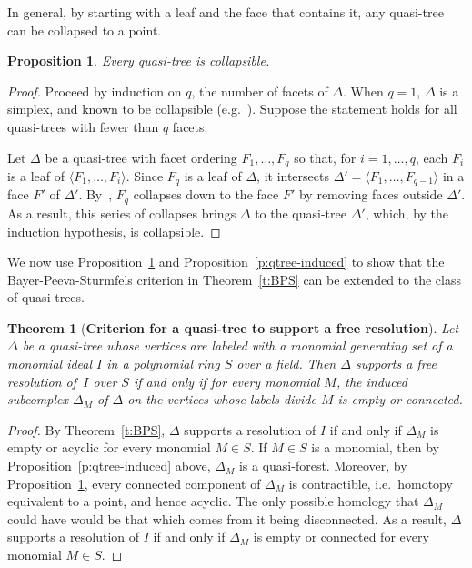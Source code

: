 \documentclass[11pt]{article}
\newtheorem{theorem}[theo]{Theorem}
\newtheorem{prop}[theo]{Proposition}
\theoremstyle{definition}
\providecommand{\eg}{e.g.\ }
\providecommand{\ie}{i.e.\ }
\numberwithin{equation}{section}
\newcommand{\D}{\Delta}
\newcommand{\tuple}[1]{\langle #1 \rangle}
\begin{document}
In general, by starting with a leaf and the face that contains it, any
quasi-tree can be collapsed to a point.


\begin{prop}\label{p:qtree-collapsible}
Every quasi-tree is collapsible. 
\end{prop}


\begin{proof} 
Proceed by induction on $q$, the number of facets of $\D$. When $q=1$,
$\D$ is a simplex, and known to be collapsible (\eg \cite[Proposition~2.7]{F14}). Suppose the statement holds for all quasi-trees with
fewer than $q$ facets.

Let $\D$ be a quasi-tree with facet ordering $F_1,\ldots,F_q$ so
that,  for $i=1,\ldots,q$, each $F_i$ is a leaf of $\tuple{F_1,\ldots,F_i}$.  Since $F_q$ is a leaf of $\D$, it intersects
$\D'=\tuple{F_1,\ldots,F_{q-1}}$ in a face $F'$ of $\D'$. By~\cite[Proposition~2.7]{F14}, $F_q$ collapses down to the face
$F'$ by removing faces outside $\D'$. As a result, this series of
collapses brings $\D$ to the quasi-tree $\D'$, which, by the induction
hypothesis, is collapsible. 
\end{proof}



We now use Proposition~\ref{p:qtree-collapsible} and Proposition~\ref{p:qtree-induced} to
show that the Bayer-Peeva-Sturmfels criterion in Theorem~\ref{t:BPS} can be extended to the class
of quasi-trees.

\begin{theorem}[{\bf Criterion for a quasi-tree to support a free  resolution}]\label{t:res-by-quasitree} Let~$\D$ be a quasi-tree whose vertices are labeled
with a monomial generating set of a monomial ideal $I$ in a
polynomial ring $S$ over a field.  Then $\D$ supports a free
resolution of~$I$ over $S$ if and only if for every monomial $M$, the
induced subcomplex $\D_M$ of $\D$ on the vertices whose labels divide
$M$ is empty or connected.
\end{theorem}


\begin{proof} By Theorem~\ref{t:BPS}, $\D$ supports a
resolution of $I$ if and only if $\D_M$ is empty or acyclic for
every monomial $M \in S$. If $M \in S$ is a monomial, then by
Proposition~\ref{p:qtree-induced} above, $\D_M$ is a quasi-forest.  Moreover,
by Proposition~\ref{p:qtree-collapsible}, every connected component of $\D_M$
is contractible, \ie homotopy equivalent to a point, and hence
acyclic. The only possible homology that $\D_M$ could have would be that which comes
from it being disconnected. As a result, $\D$ supports a
resolution of $I$ if and only if $\D_M$ is empty or connected for
every monomial $M \in S$.
\end{proof}
\end{document}
